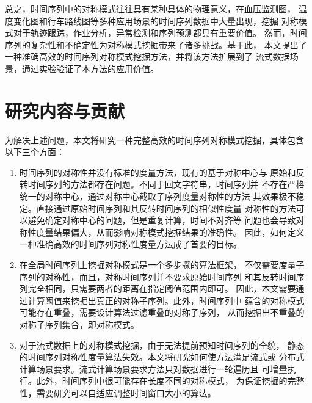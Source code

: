 总之，时间序列中的对称模式往往具有某种具体的物理意义，在血压监测图，
温度变化图和行车路线图等多种应用场景的时间序列数据中大量出现，挖掘
对称模式对于轨迹跟踪，作业分析，异常检测和序列预测都具有重要价值。
然而，时间序列的复杂性和不确定性为对称模式挖掘带来了诸多挑战。基于此，
本文提出了一种准确高效的时间序列对称模式挖掘方法，并将该方法扩展到了
流式数据场景，通过实验验证了本方法的应用价值。


\section{研究内容与贡献}
为解决上述问题，本文将研究一种完整高效的时间序列对称模式挖掘，具体包含
以下三个方面：
\begin{enumerate}
  \item 时间序列的对称性并没有标准的度量方法，现有的基于对称中心与
  原始和反转时间序列的方法都存在问题。不同于回文字符串，时间序列并
  不存在严格统一的对称中心，通过对称中心截取子序列度量对称性的方法
  其效果极不稳定。直接通过原始时间序列和其反转时间序列的相似性度量
  对称性的方法可以避免确定对称中心的问题，但是重复计算，时间不对齐等
  问题也会导致对称性度量结果偏大，从而影响对称模式挖掘结果的准确性。
  因此，如何定义一种准确高效的时间序列对称性度量方法成了首要的目标。
  \item 在全局时间序列上挖掘对称模式是一个多步骤的算法框架，
  不仅需要度量子序列的对称性，而且，对称时间序列并不要求原始时间序列
  和其反转时间序列完全相同，只需要两者的距离在指定阈值范围内即可。
  因此，本文需要通过计算阈值来挖掘出真正的对称子序列。此外，时间序列中
  蕴含的对称模式可能存在重叠，需要设计算法过滤重叠的对称子序列，
  从而挖掘出不重叠的对称子序列集合，即对称模式。
  \item 对于流式数据上的对称模式挖掘，由于无法提前预知时间序列的全貌，
  静态的时间序列对称性度量算法失效。本文将研究如何使方法满足流式或
  分布式计算场景要求。流式计算场景要求方法只对数据进行一轮遍历且
  可增量执行。此外，时间序列中很可能存在长度不同的对称模式，
  为保证挖掘的完整性，需要研究可以自适应调整时间窗口大小的算法。
\end{enumerate}

